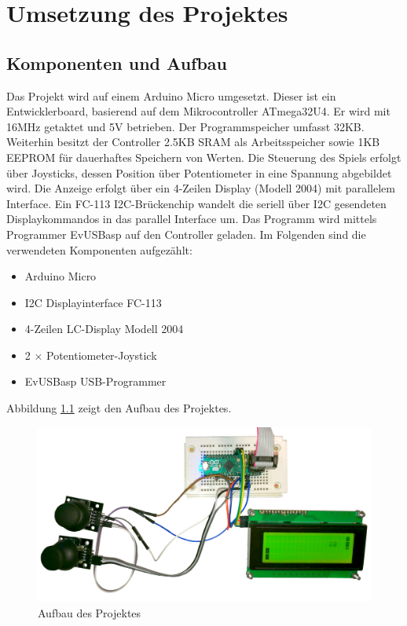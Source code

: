 \chapter{Umsetzung des Projektes}
\section{Komponenten und Aufbau}
\label{sec:Peri}
Das Projekt wird auf einem Arduino Micro umgesetzt. Dieser ist ein Entwicklerboard, basierend auf dem Mikrocontroller ATmega32U4. Er wird mit 16MHz getaktet und 5V betrieben. Der Programmspeicher umfasst 32KB. Weiterhin besitzt der Controller 2.5KB SRAM als Arbeitsspeicher sowie 1KB EEPROM für dauerhaftes Speichern von Werten.
Die Steuerung des Spiels erfolgt über Joysticks, dessen Position über Potentiometer in eine Spannung abgebildet wird. 
Die Anzeige erfolgt über ein 4-Zeilen Display (Modell 2004) mit parallelem Interface. Ein FC-113 I2C-Brückenchip wandelt die seriell über I2C gesendeten Displaykommandos in das parallel Interface um. Das Programm wird mittels Programmer EvUSBasp auf den Controller geladen. Im Folgenden sind die verwendeten Komponenten aufgezählt:
\begin{itemize}
\setlength\itemsep{-0.5em}
\item Arduino Micro
\item I2C Displayinterface FC-113 
\item 4-Zeilen LC-Display Modell 2004
\item 2 $\times$ Potentiometer-Joystick
\item EvUSBasp USB-Programmer
\end{itemize}

Abbildung \ref{fig:Aufbau} zeigt den Aufbau des Projektes.
\begin{figure}[H]
\includegraphics[width=\textwidth]{./Bilder/Aufbau.jpg}
\caption{Aufbau des Projektes}
\label{fig:Aufbau}
\end{figure}

